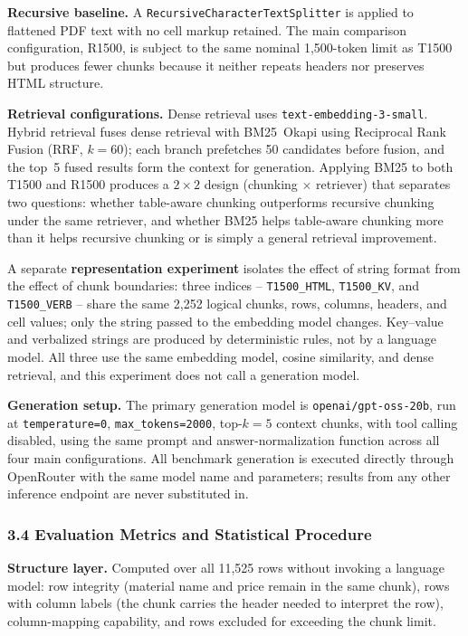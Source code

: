 \documentclass[11pt,a4paper]{article}
\begin{document}
\textbf{Recursive baseline.} A \texttt{RecursiveCharacterTextSplitter} is
applied to flattened PDF text with no cell markup retained. The main
comparison configuration, R1500, is subject to the same nominal 1,500-token
limit as T1500 but produces fewer chunks because it neither repeats headers
nor preserves HTML structure.

\textbf{Retrieval configurations.} Dense retrieval uses
\texttt{text-embedding-3-small}. Hybrid retrieval fuses dense retrieval with
BM25~Okapi using Reciprocal Rank Fusion (RRF, $k=60$); each branch prefetches
50 candidates before fusion, and the top~5 fused results form the context for
generation. Applying BM25 to both T1500 and R1500 produces a $2\times2$
design (chunking $\times$ retriever) that separates two questions: whether
table-aware chunking outperforms recursive chunking under the same
retriever, and whether BM25 helps table-aware chunking more than it helps
recursive chunking or is simply a general retrieval improvement.

A separate \textbf{representation experiment} isolates the effect of string
format from the effect of chunk boundaries: three indices --
\texttt{T1500\_HTML}, \texttt{T1500\_KV}, and \texttt{T1500\_VERB} -- share
the same 2,252 logical chunks, rows, columns, headers, and cell values;
only the string passed to the embedding model changes. Key--value and
verbalized strings are produced by deterministic rules, not by a language
model. All three use the same embedding model, cosine similarity, and dense
retrieval, and this experiment does not call a generation model.

\textbf{Generation setup.} The primary generation model is
\texttt{openai/gpt-oss-20b}, run at \texttt{temperature=0},
\texttt{max\_tokens=2000}, top-$k=5$ context chunks, with tool calling
disabled, using the same prompt and answer-normalization function across all
four main configurations. All benchmark generation is executed directly
through OpenRouter with the same model name and parameters; results from any
other inference endpoint are never substituted in.

\subsubsection{3.4 Evaluation Metrics and Statistical Procedure}

\textbf{Structure layer.} Computed over all 11,525 rows without invoking a
language model: row integrity (material name and price remain in the same
chunk), rows with column labels (the chunk carries the header needed to
interpret the row), column-mapping capability, and rows excluded for
exceeding the chunk limit.
\end{document}
